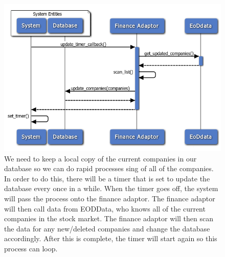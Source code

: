 \begin{figure}
\centering
\includegraphics[width=5.5in]{./Diagrams/InteractionDiagrams/updatingdatabase.png}
\caption{We need to keep a local copy of the current companies in our database so we can do rapid processes sing of all of the companies. In order to do this, there will be a timer that is set to update the database every once in a while. When the timer goes off, the system will pass the process onto the finance adaptor. The finance adaptor will then call data from EODData, who knows all of the current companies in the stock market. The finance adaptor will then scan the data for any new/deleted companies and change the database accordingly. After this is complete, the timer will start again so this process can loop.}
\end{figure}
